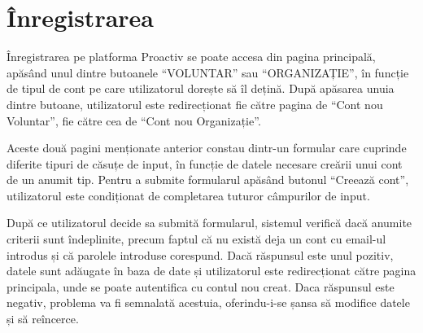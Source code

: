 \documentclass[12pt,a4paper]{report}
\begin{document}
\section{Înregistrarea}
\par
Înregistrarea pe platforma Proactiv se poate accesa din pagina principală, apăsând unul dintre butoanele  “VOLUNTAR” sau  “ORGANIZAȚIE”, în funcție de tipul de cont pe care utilizatorul dorește să îl dețină. După apăsarea unuia dintre butoane, utilizatorul este redirecționat fie către pagina de  “Cont nou Voluntar”, fie către cea de  “Cont nou Organizație”.
\\
\par
Aceste două pagini menționate anterior constau dintr-un formular care cuprinde diferite tipuri de căsuțe de input, în funcție de datele necesare creării unui cont de un anumit tip. Pentru a submite formularul apăsând butonul  “Creează cont”, utilizatorul este condiționat de completarea tuturor câmpurilor de input. 
\\
\par
După ce utilizatorul decide sa submită formularul, sistemul verifică dacă anumite criterii sunt îndeplinite, precum faptul că nu există deja un cont cu email-ul introdus și că parolele introduse corespund. Dacă răspunsul este unul pozitiv, datele sunt adăugate în baza de date și utilizatorul este redirecționat către pagina principala, unde se poate autentifica cu contul nou creat. Daca răspunsul este negativ, problema va fi semnalată acestuia, oferindu-i-se șansa să modifice datele și să reîncerce.
\\
\lstset{frame=Trbl,numbers=left,showstringspaces=false}
\end{document}
